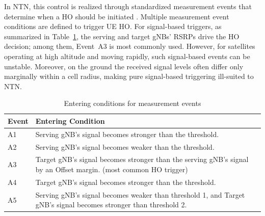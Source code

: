 In NTN, this control is realized through standardized measurement events that determine when a HO should be initiated \cite{rel_38331}. 
Multiple measurement event conditions are defined to trigger UE HO. For signal-based triggers, as summarized in Table~\ref{tab:entering_conditions}, the serving and target gNBs' RSRPs drive the HO decision; among them, Event~A3 is most commonly used. However, for satellites operating at high altitude and moving rapidly, such signal-based events can be unstable. Moreover, on the ground the received signal levels often differ only marginally within a cell radius, making pure signal-based triggering ill-suited to NTN.


\begin{table}[t]
\centering
\caption{Entering conditions for measurement events}
\label{tab:entering_conditions}
    \begin{tabular}{l p{11cm}}
    \hline
        \textbf{Event} & \textbf{Entering Condition} \\
    \hline
    A1 & Serving gNB's signal becomes stronger than the threshold. \\
    A2 & Serving gNB's signal becomes weaker than the threshold. \\
    A3 & Target gNB's signal becomes stronger than the serving gNB's signal by an Offset margin. (most common HO trigger) \\
    A4 & Target gNB's signal becomes stronger than the threshold. \\
    A5 & Serving gNB's signal becomes weaker than threshold 1, and Target gNB's signal becomes stronger than threshold 2. \\
    \hline
    \end{tabular}
\end{table}

